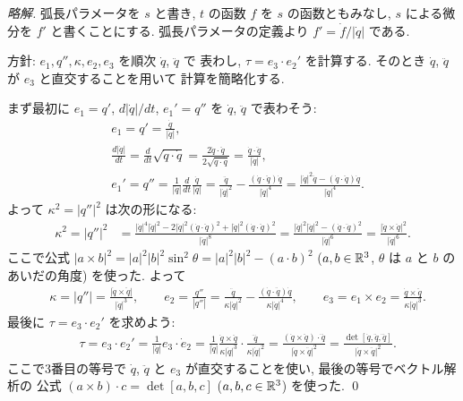 \documentclass[12pt,twoside]{jarticle}
\begin{document}
\begin{proof}[略解]
 弧長パラメータを $s$ と書き, $t$ の函数 $f$ を $s$ の函数ともみなし, 
 $s$ による微分を $f'$ と書くことにする. 
 弧長パラメータの定義より $f' = \dot f/|\dot q|$ である.

 方針: $e_1,q'',\kappa,e_2,e_3$ を順次 $\dot q$, $\ddot q$ で
 表わし, $\tau = e_3\cdot e_2'$ を計算する. 
 そのとき $\dot q$, $\ddot q$ が $e_3$ と直交することを用いて
 計算を簡略化する.

 まず最初に $e_1=q'$, $d|\dot q|/dt$, $e_1'=q''$ を $\dot q$, $\ddot q$ 
 で表わそう:
 \begin{align*}
  &
  e_1 = q' = \frac{\dot q}{|\dot q|},
  \\ &
  \frac{d|\dot q|}{dt}
  = \frac{d}{dt}\sqrt{\dot q\cdot \dot q}
  = \frac{2\dot q\cdot\ddot q}{2\sqrt{\dot q\cdot \dot q}}
  = \frac{\dot q\cdot\ddot q}{|\dot q|},
  \\ &
  e_1'=q''=\frac{1}{|\dot q|}\frac{d}{dt}\frac{\dot q}{|\dot q|}
  = \frac{\ddot q}{|\dot q|^2} 
  - \frac{(\dot q\cdot\ddot q)\dot q}{|\dot q|^4}
  = \frac{|\dot q|^2\ddot q - (\dot q\cdot\ddot q)\dot q}{|\dot q|^4}.
 \end{align*}
 よって $\kappa^2 = |q''|^2$ は次の形になる:
 \begin{align*}
  \kappa^2=|q''|^2
  &
  = \frac{|\dot q|^4|\ddot q|^2 
  - 2|\dot q|^2(\dot q\cdot \ddot q)^2 
  + |\dot q|^2(\dot q\cdot \ddot q)^2}{|\dot q|^8}
  = \frac{|\dot q|^2|\ddot q|^2-(\dot q\cdot \ddot q)^2}{|\dot q|^6}
  = \frac{|\dot q\times \ddot q|^2}{|\dot q|^6}.
 \end{align*}
 ここで公式 $|a\times b|^2=|a|^2|b|^2\sin^2\theta=|a|^2|b|^2-(a\cdot b)^2$
 ($a,b\in{\mathbb R}^3$, $\theta$ は $a$ と $b$ のあいだの角度) を使った. よって
 \begin{align*}
  &
  \kappa = |q''| = \frac{|\dot q\times \ddot q|}{|\dot q|^3},
  \qquad
  e_2 = \frac{q''}{|q''|} 
  = \frac{\ddot q}{\kappa|\dot q|^2} 
  - \frac{(\dot q\cdot\ddot q)\dot q}{\kappa|\dot q|^4},
  \qquad
  e_3=e_1\times e_2
  = \frac{\dot q\times \ddot q}{\kappa|\dot q|^3}.
 \end{align*}
 最後に $\tau=e_3\cdot e_2'$ を求めよう:
 \begin{align*}
  &
  \tau = e_3\cdot e_2' = \frac{1}{|\dot q|}e_3\cdot\dot e_2
  = 
  \frac{1}{|\dot q|} 
  \frac{\dot q\times \ddot q}{\kappa|\dot q|^3}
  \cdot
  \frac{\dddot q}{\kappa|\dot q|^2}
  = \frac{(\dot q\times \ddot q)\cdot \dddot q}{|\dot q\times \ddot q|^2}
  = \frac{\det[\dot q,\ddot q,\dddot q]}{|\dot q\times \ddot q|^2}.
 \end{align*}
 ここで3番目の等号で $\dot q$, $\ddot q$ と $e_3$ が直交することを使い, 
 最後の等号でベクトル解析の
 公式 $(a\times b)\cdot c=\det[a,b,c]$ ($a,b,c\in{\mathbb R}^3$) を使った.
 \qed
\end{proof}

\end{document}
